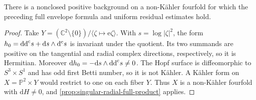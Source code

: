\begin{example}\label{ex:singular-radial-hopf-fourfold}
There is a nonclosed positive background on a non-K\"ahler fourfold for which the preceding full envelope formula and uniform residual estimates hold.
\end{example}
\begin{proof}
Take $Y=(\mathbb C^2\setminus\{0\})/\langle\zeta\mapsto\mathrm e\zeta\rangle$. With $s=\log|\zeta|^2$, the form $h_0=\mathrm{dd}^{\mathrm{c}} s+\mathrm ds\wedge\mathrm d^{\mathrm c} s$ is invariant under the quotient. Its two summands are positive on the tangential and radial complex directions, respectively, so it is Hermitian. Moreover $\mathrm dh_0=-\mathrm ds\wedge\mathrm{dd}^{\mathrm{c}} s\ne0$. The Hopf surface is diffeomorphic to $S^3\times S^1$ and has odd first Betti number, so it is not K\"ahler. A K\"ahler form on $X=\mathbb P^2\times Y$ would restrict to one on each fiber $Y$. Thus $X$ is a non-K\"ahler fourfold with $\mathrm dH\ne0$, and \cref{prop:singular-radial-full-product} applies.
\end{proof}
